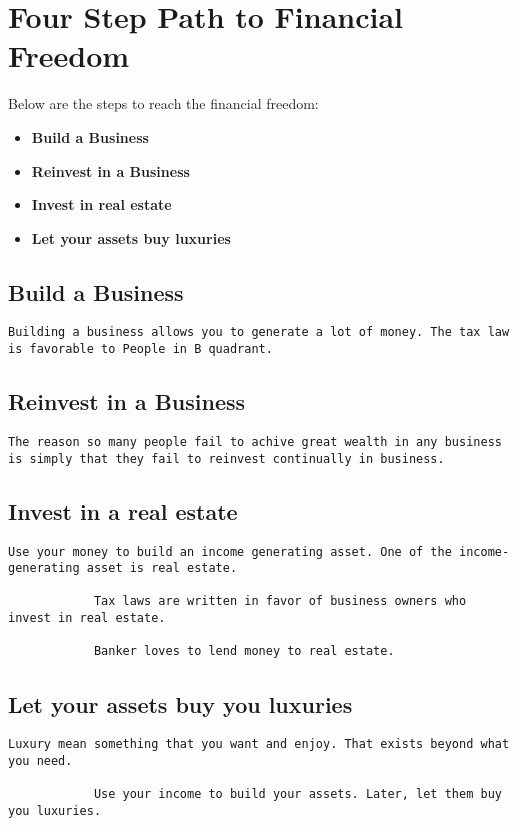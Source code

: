 \documentclass[a4paper, 12pt]{report}
\begin{document}
    \section{Four Step Path to Financial Freedom}
    Below are the steps to reach the financial freedom:
    \begin{itemize}
        \item \textbf{Build a Business}
         \item \textbf{Reinvest in a Business}
          \item \textbf{Invest in real estate} 
           \item \textbf{Let your assets buy luxuries} 
        
    \end{itemize}
    \subsection{Build a Business}
    \begin{lstlisting}[style=latexFrameTB]
            Building a business allows you to generate a lot of money. The tax law is favorable to People in B quadrant.
    \end{lstlisting}
    \subsection{Reinvest in a Business}
    \begin{lstlisting}[style=latexFrameTB]
            The reason so many people fail to achive great wealth in any business is simply that they fail to reinvest continually in business.
    \end{lstlisting}
    \subsection{Invest in a real estate}
    \begin{lstlisting}[style=latexFrameTB]
            Use your money to build an income generating asset. One of the income-generating asset is real estate.
            
            Tax laws are written in favor of business owners who invest in real estate.
            
            Banker loves to lend money to real estate.
    \end{lstlisting}
    \subsection{Let your assets buy you luxuries}
    \begin{lstlisting}[style=latexFrameTB]
            Luxury mean something that you want and enjoy. That exists beyond what you need.
            
            Use your income to build your assets. Later, let them buy you luxuries.
            
    \end{lstlisting}
\end{document}
